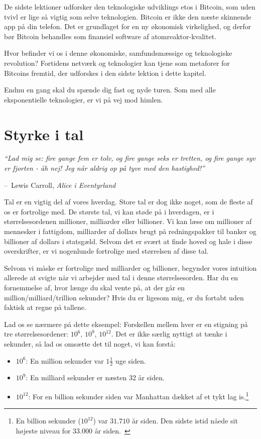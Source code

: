 \documentclass[paper=6in:9in,pagesize=pdftex,headinclude=on,footinclude=on,12pt]{scrbook}
\makeatletter
\newenvironment{chapquote}[2][4em]{\setlength{\@tempdima}{#1}%
   \def\chapquote@author{#2}%
   \parshape 1 \@tempdima \dimexpr\textwidth-2\@tempdima\relax%
   \itshape}{\par\normalfont\hfill--\ \chapquote@author\hspace*{\@tempdima}\par\bigskip}
\makeatother
\begin{document}
De sidste lektioner udforsker den teknologiske udviklings etos i Bitcoin, som uden tvivl er lige så vigtig som selve teknologien. Bitcoin er ikke den næste skinnende app på din telefon. Det er grundlaget for en ny økonomisk virkelighed, og derfor bør Bitcoin behandles som finansiel software af atomreaktor-kvalitet.

Hvor befinder vi os i denne økonomiske, samfundsmæssige og teknologiske revolution? Fortidens netværk og teknologier kan tjene som metaforer for Bitcoins fremtid, der udforskes i den sidste lektion i dette kapitel.

Endnu en gang skal du spænde dig fast og nyde turen. Som med alle eksponentielle teknologier, er vi på vej mod himlen. 
\chapter{Styrke i tal}
\label{les:15}

\begin{chapquote}{Lewis Carroll, \textit{Alice i Eventyrland}} \enquote{Lad mig se: fire gange fem er tolv, og fire gange seks er tretten, og fire gange syv er fjorten - åh nej! Jeg når aldrig op på tyve med den hastighed!} \end{chapquote}

Tal er en vigtig del af vores hverdag. Store tal er dog ikke noget, som de fleste af os er fortrolige med. De største tal, vi kan støde på i hverdagen, er i størrelsesordenen millioner, milliarder eller billioner. Vi kan læse om millioner af mennesker i fattigdom, milliarder af dollars brugt på redningspakker til banker og billioner af dollars i statsgæld. Selvom det er svært at finde hoved og hale i disse overskrifter, er vi nogenlunde fortrolige med størrelsen af disse tal.

Selvom vi måske er fortrolige med milliarder og billioner, begynder vores intuition allerede at svigte når vi arbejder med tal i denne størrelsesorden. Har du en fornemmelse af, hvor længe du skal vente på, at der går en million/milliard/trillion sekunder? Hvis du er ligesom mig, er du fortabt uden faktisk at regne på tallene.

Lad os se nærmere på dette eksempel: Forskellen mellem hver er en stigning på tre størrelsesordener: $10^6$, $10^9$, $10^{12}$. Det er ikke særlig nyttigt at tænke i sekunder, så lad os omsætte det til noget, vi kan forstå:\begin{itemize}
  \item $10^6$: En million sekunder var $1 \frac{1}{2}$ uge siden. \item $10^9$: En milliard sekunder er næsten 32 år siden. \item $10^{12}$: For en billion sekunder siden var Manhattan dækket af et tykt lag is.\footnote{En billion sekunder ($10^{12}$) var $31.710$ år siden. Den sidste istid nåede sit højeste niveau for $33.000$ år siden.~\cite{wiki:LGM}}
\end{itemize}
\end{document}
